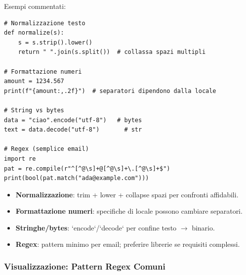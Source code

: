 \begin{tcolorbox}[title={Per chi viene da C/Java/JS: stringhe, bytes ed encoding}]
\begin{center}
\end{center}

Esempi commentati:
\begin{lstlisting}
# Normalizzazione testo
def normalize(s):
    s = s.strip().lower()
    return " ".join(s.split())  # collassa spazi multipli

# Formattazione numeri
amount = 1234.567
print(f"{amount:,.2f}")  # separatori dipendono dalla locale

# String vs bytes
data = "ciao".encode("utf-8")   # bytes
text = data.decode("utf-8")       # str

# Regex (semplice email)
import re
pat = re.compile(r"^[^@\s]+@[^@\s]+\.[^@\s]+$")
print(bool(pat.match("ada@example.com")))
\end{lstlisting}
\begin{tcolorbox}[title=Spiegazione del codice]
\begin{itemize}
  \item \textbf{Normalizzazione}: trim + lower + collapse spazi per confronti affidabili.
  \item \textbf{Formattazione numeri}: specifiche di locale possono cambiare separatori.
  \item \textbf{Stringhe/bytes}: `encode`/`decode` per confine testo $\rightarrow$ binario.
  \item \textbf{Regex}: pattern minimo per email; preferire librerie se requisiti complessi.
\end{itemize}
\end{tcolorbox}

\subsubsection{Visualizzazione: Pattern Regex Comuni}


\end{tcolorbox}

